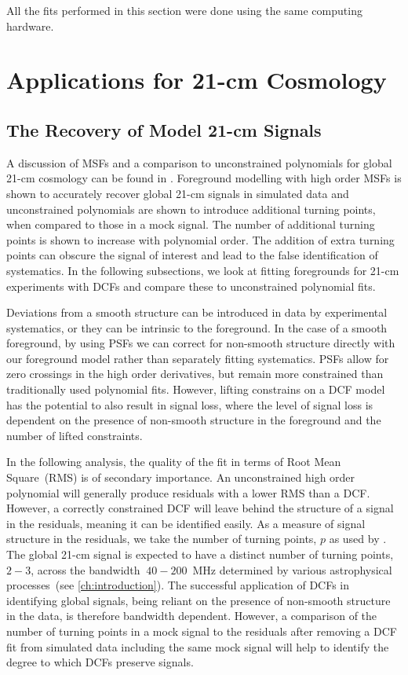 All the fits performed in this section were done using the same computing hardware.

\section{Applications for 21-cm Cosmology}
\label{sec:21}

\subsection{The Recovery of Model 21-cm Signals}

A discussion of MSFs and a comparison to unconstrained polynomials for global 21-cm cosmology can be found in \cite{Sathyanarayana_msf_2017}. Foreground modelling with high order MSFs is shown to accurately recover global 21-cm signals in simulated data and unconstrained polynomials are shown to introduce additional turning points, when compared to those in a mock signal. The number of additional turning points is shown to increase with polynomial order. The addition of extra turning points can obscure the signal of interest and lead to the false identification of systematics. In the following subsections, we look at fitting foregrounds for 21-cm experiments with DCFs and compare these to unconstrained polynomial fits. 

Deviations from a smooth structure can be introduced in data by experimental systematics, or they can be intrinsic to the foreground. In the case of a smooth foreground, by using PSFs we can correct for non-smooth structure directly with our foreground model rather than separately fitting systematics. PSFs allow for zero crossings in the high order derivatives, but remain more constrained than traditionally used polynomial fits. However, lifting constrains on a DCF model has the potential to also result in signal loss, where the level of signal loss is dependent on the presence of non-smooth structure in the foreground and the number of lifted constraints.

In the following analysis, the quality of the fit in terms of Root Mean Square~(RMS) is of secondary importance. An unconstrained high order polynomial will generally produce residuals with a lower RMS than a DCF. However, a correctly constrained DCF will leave behind the structure of a signal in the residuals, meaning it can be identified easily. As a measure of signal structure in the residuals, we take the number of turning points, $p$ as used by \cite{Sathyanarayana_msf_2017}. The global 21-cm signal is expected to have a distinct number of turning points, $2 - 3$, across the bandwidth $~40 - 200$~MHz determined by various astrophysical processes~(see \cref{ch:introduction}). The successful application of DCFs in identifying global signals, being reliant on the presence of non-smooth structure in the data, is therefore bandwidth dependent. However, a comparison of the number of turning points in a mock signal to the residuals after removing a DCF fit from simulated data including the same mock signal will help to identify the degree to which DCFs preserve signals.

